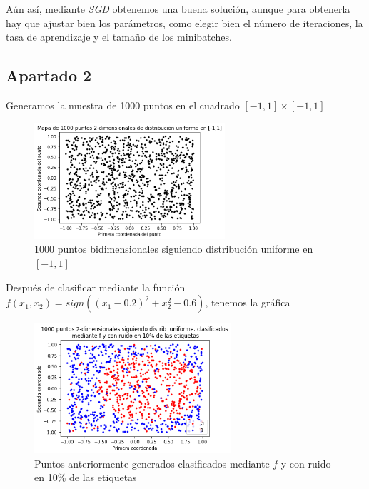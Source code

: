 \documentclass[11pt,a4paper]{article}
\theoremstyle{definition}
\begin{document}
	 Aún así, mediante \textit{SGD} obtenemos una buena solución, aunque para obtenerla hay que ajustar bien los parámetros, como elegir bien el número de iteraciones, la tasa de aprendizaje y el tamaño de los minibatches. 
	
	
	\subsection{Apartado 2}
	Generamos la muestra de 1000 puntos en el cuadrado $[-1,1]\times [-1,1]$
	\begin{figure}[H]
		\centering
		\includegraphics[width=0.63\textwidth]{images/dist_unif_puntos}
		\caption{1000 puntos bidimensionales siguiendo distribución uniforme en $[-1,1]$}
	\end{figure}
	
	Después de clasificar mediante la función $f(x_1,x_2)=sign((x_1 - 0.2)^2 + x_2^2 - 0.6)$, tenemos la gráfica
	
	\begin{figure}[H]
		\centering
		\includegraphics[width=0.65\textwidth]{images/1000_puntos_unif_clasi}
		\caption{Puntos anteriormente generados clasificados mediante $f$ y con ruido en 10\% de las etiquetas}
	\end{figure}
	
\end{document}
